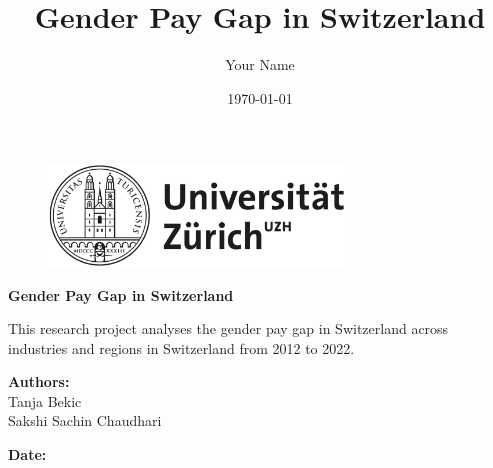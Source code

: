 \documentclass{article}
\author{Your Name}
\date{\today}
\begin{document}
\title{\textbf{Gender Pay Gap in Switzerland}}


\begin{titlepage}
\centering

\begin{figure}[H]
    \centering
    \includegraphics[width=0.7\textwidth]{Figures/uzhseal.png} 
    \label{fig:example}
\end{figure}
    
    \vspace{1cm}
    \Huge
    \textbf{Gender Pay Gap in Switzerland}
    
    \vspace{1cm}
    \LARGE
    This research project analyses the gender pay gap in Switzerland across industries and regions in Switzerland from 2012 to 2022. 
    
    \vspace{1cm}
    \textbf{Authors:}\\ Tanja Bekic \\  Sakshi Sachin Chaudhari
    \vspace{1cm}
    
    \textbf{Date:}\\
    \thedate
    \vfill
    
\end{titlepage}
\end{document}
